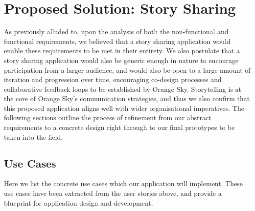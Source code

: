 \section{Proposed Solution: Story Sharing}

As previously alluded to, upon the analysis of both the non-functional and functional requirements, we believed that a story sharing application would enable these requirements to be met in their entirety. We also postulate that a story sharing application would also be generic enough in nature to encourage participation from a larger audience, and would also be open to a large amount of iteration and progression over time, encouraging co-design processes and collaborative feedback loops to be established by Orange Sky. Storytelling is at the core of Orange Sky's communication strategies, and thus we also confirm that this proposed application aligns well with wider organisational imperatives. The following sections outline the process of refinement from our abstract requirements to a concrete design right through to our final prototypes to be taken into the field.

\subsection{Use Cases}

Here we list the concrete use cases which our application will implement. These use cases have been extracted from the user stories above, and provide a blueprint for application design and development.

